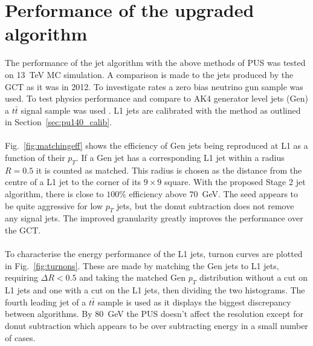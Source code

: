 \section{Performance of the upgraded algorithm}
\label{sec:l1jec}

\label{sec:jet_algo_performance}
The performance of the jet algorithm with the above methods of PUS was tested on 13~TeV MC simulation. A comparison is made to the jets produced by the GCT as it was in 2012. To investigate rates a zero bias neutrino gun sample was used. To test physics performance and compare to AK4 generator level jets (Gen) a $t\bar{t}$ signal sample was used . L1 jets are calibrated with the method as outlined in Section~\ref{sec:pu140_calib}.
\\\\
Fig.~\ref{fig:matchingeff} shows the efficiency of Gen jets being reproduced at L1 as a function of their $p_T$. If a Gen jet has a corresponding L1 jet within a radius $R=0.5$ it is counted as matched. This radius is chosen as the distance from the centre of a L1 jet to the corner of its $9\times9$ square. With the proposed Stage 2 jet algorithm, there is close to $100\%$ efficiency above $70$~GeV. The seed appears to be quite aggressive for low $p_T$ jets, but the donut subtraction does not remove any signal jets. The improved granularity greatly improves the performance over the GCT.
\\\\
\noindent To characterise the energy performance of the L1 jets, turnon curves are plotted in Fig.~\ref{fig:turnons}. These are made by matching the Gen jets to L1 jets, requiring $\Delta R<0.5$ and taking the matched Gen $p_T$ distribution without a cut on L1 jets and one with a cut on the L1 jets, then dividing the two histograms. The fourth leading jet of a $t\bar{t}$ sample is used as it displays the biggest discrepancy between algorithms. By $80$~GeV the PUS doesn't affect the resolution except for donut subtraction which appears to be over subtracting energy in a small number of cases.
